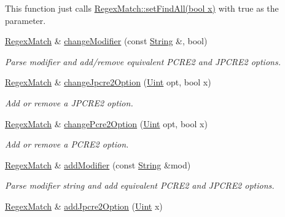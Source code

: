 \begin{DoxyCompactItemize}
\begin{DoxyCompactList}
This function just calls \hyperlink{classjpcre2_1_1RegexMatch_ae586d43ec197c57c66086eeb4f8d83a1_ae586d43ec197c57c66086eeb4f8d83a1}{Regex\+Match\+::set\+Find\+All(bool x)} with {\ttfamily true} as the parameter. \end{DoxyCompactList}\item 
\hyperlink{classjpcre2_1_1RegexMatch}{Regex\+Match} \& \hyperlink{classjpcre2_1_1RegexMatch_a877be3123d789020d259939bc79e8cfe_a877be3123d789020d259939bc79e8cfe}{change\+Modifier} (const \hyperlink{namespacejpcre2_a91f03070152fb228bc116c5a737f1d16}{String} \&, bool)
\begin{DoxyCompactList}\small\item\em Parse modifier and add/remove equivalent P\+C\+R\+E2 and J\+P\+C\+R\+E2 options. \end{DoxyCompactList}\item 
\hyperlink{classjpcre2_1_1RegexMatch}{Regex\+Match} \& \hyperlink{classjpcre2_1_1RegexMatch_a154430c66b8794d6632be6211a3ce870_a154430c66b8794d6632be6211a3ce870}{change\+Jpcre2\+Option} (\hyperlink{namespacejpcre2_a078242d38221a13fb3543b9edd78c099}{Uint} opt, bool x)
\begin{DoxyCompactList}\small\item\em Add or remove a J\+P\+C\+R\+E2 option. \end{DoxyCompactList}\item 
\hyperlink{classjpcre2_1_1RegexMatch}{Regex\+Match} \& \hyperlink{classjpcre2_1_1RegexMatch_a6893abc21b24a9d9fca146a33c0f823c_a6893abc21b24a9d9fca146a33c0f823c}{change\+Pcre2\+Option} (\hyperlink{namespacejpcre2_a078242d38221a13fb3543b9edd78c099}{Uint} opt, bool x)
\begin{DoxyCompactList}\small\item\em Add or remove a P\+C\+R\+E2 option. \end{DoxyCompactList}\item 
\hyperlink{classjpcre2_1_1RegexMatch}{Regex\+Match} \& \hyperlink{classjpcre2_1_1RegexMatch_a08c2e481fe8b9c001e67733fb4e33972_a08c2e481fe8b9c001e67733fb4e33972}{add\+Modifier} (const \hyperlink{namespacejpcre2_a91f03070152fb228bc116c5a737f1d16}{String} \&mod)
\begin{DoxyCompactList}\small\item\em Parse modifier string and add equivalent P\+C\+R\+E2 and J\+P\+C\+R\+E2 options. \end{DoxyCompactList}\item 
\hyperlink{classjpcre2_1_1RegexMatch}{Regex\+Match} \& \hyperlink{classjpcre2_1_1RegexMatch_a0a4cf8554a7e00f3cf2db34f60a43f60_a0a4cf8554a7e00f3cf2db34f60a43f60}{add\+Jpcre2\+Option} (\hyperlink{namespacejpcre2_a078242d38221a13fb3543b9edd78c099}{Uint} x)

\end{DoxyCompactItemize}
